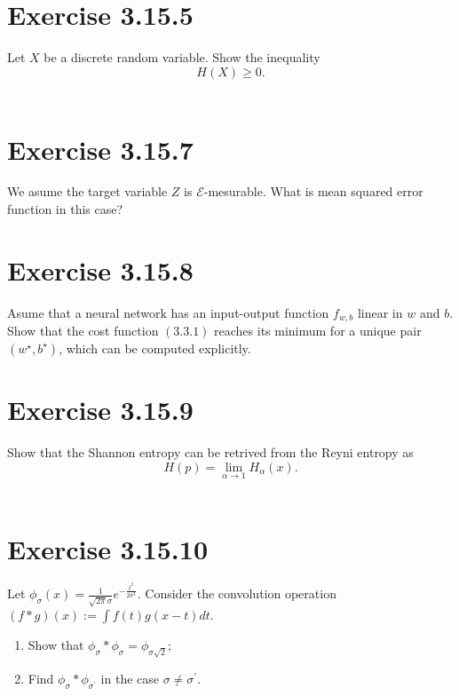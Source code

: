 \documentclass{exam}
\begin{document}
\section*{Exercise 3.15.5}
Let $X$ be a discrete random variable. Show the inequality\\
\begin{equation*}
    H(X) \geq 0.
\end{equation*}\\

\section*{Exercise 3.15.7}
We asume the target variable $Z$ is $\mathcal{E}$-mesurable. What is mean squared error function in this case?

\section*{Exercise 3.15.8}
Asume that a neural network has an input-output function $f_{w,b}$ linear in $w$ and $b$. Show that the cost function $(3.3.1)$ reaches its minimum for a 
unique pair $(w^{\star},b^{\star})$, which can be computed explicitly. 

\section*{Exercise 3.15.9}
Show that the Shannon entropy can be retrived from the Reyni entropy as\\
\begin{equation*}
    H(p) = \lim_{\alpha \to 1} H_{\alpha}(x).
\end{equation*}\\

\section*{Exercise 3.15.10}
Let $\phi_\sigma(x) = \displaystyle \frac{1}{\sqrt{2\pi}\sigma}e^{-\frac{t^2}{2\sigma^2}}$. Consider the convolution 
operation $(f \ast g)(x) :=  \displaystyle\int f(t) g(x - t) dt $.
\begin{enumerate}
    \item Show that $\phi_{\sigma} \ast \phi_{\sigma} = \phi_{\sigma\sqrt{2}}$;
    \item Find $\phi_{\sigma} \ast \phi_{\sigma^{\prime}}$ in the case $\sigma \neq \sigma^{\prime}$.
\end{enumerate}
\end{document}
